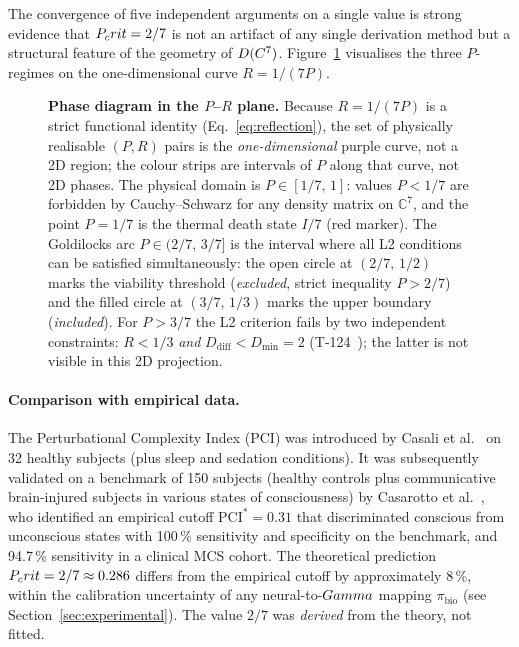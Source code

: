 The convergence of five independent arguments on a single value is strong
evidence that $P_crit = 2/7$ is not an artifact of any single derivation
method but a structural feature of the geometry of $D(C^7)$.
Figure~\ref{fig:phase-diagram} visualises the three $P$-regimes on the
one-dimensional curve $R = 1/(7P)$.

\begin{figure}[H]
\centering

\caption{\textbf{Phase diagram in the $P$--$R$ plane.} Because
$R = 1/(7P)$ is a strict functional identity (Eq.~\ref{eq:reflection}),
the set of physically realisable $(P,R)$ pairs is the \emph{one-dimensional}
purple curve, not a 2D region; the colour strips are intervals of $P$ along
that curve, not 2D phases. The physical domain is
$P \in [1/7,\,1]$: values $P < 1/7$ are forbidden by Cauchy--Schwarz for any
density matrix on $\mathbb{C}^7$, and the point $P = 1/7$ is the thermal
death state $I/7$ (red marker). The Goldilocks arc
$P \in (2/7,\,3/7]$ is the interval where all L2 conditions can be
satisfied simultaneously: the open circle at $(2/7,\,1/2)$ marks the
viability threshold (\emph{excluded}, strict inequality $P > 2/7$) and
the filled circle at $(3/7,\,1/3)$ marks the upper boundary
(\emph{included}). For $P > 3/7$ the L2 criterion fails by two
independent constraints: $R < 1/3$ \emph{and}
$D_{\mathrm{diff}} < D_{\min} = 2$ (T-124~); the latter is
not visible in this 2D projection.}
\label{fig:phase-diagram}
\end{figure}

\paragraph{Comparison with empirical data.}
The Perturbational Complexity Index (PCI) was introduced by Casali et
al.~\cite{casali2013} on 32 healthy subjects (plus sleep and sedation
conditions). It was subsequently validated on a benchmark of 150 subjects
(healthy controls plus communicative brain-injured subjects in various states
of consciousness) by Casarotto et al.~\cite{casarotto2016}, who identified an
empirical cutoff $\mathrm{PCI}^* = 0.31$ that discriminated conscious from
unconscious states with 100\,\% sensitivity and specificity on the benchmark,
and 94.7\,\% sensitivity in a clinical MCS cohort. The theoretical prediction
$P_crit = 2/7 \approx 0.286$ differs from the empirical cutoff by approximately
$8\,\%$, within the calibration uncertainty of any neural-to-$Gamma$ mapping
$\pi_{\mathrm{bio}}$ (see Section~\ref{sec:experimental}). The value $2/7$ was
\emph{derived} from the theory, not fitted.

